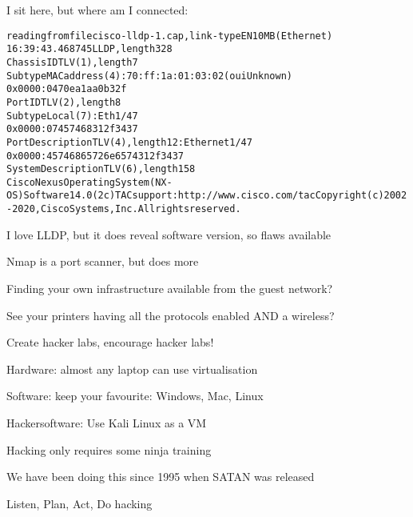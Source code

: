 \documentclass[Screen16to9,17pt,footrule]{foils}
\begin{document}
I sit here, but where am I connected:
\begin{alltt}\footnotesize
reading from file cisco-lldp-1.cap, link-type EN10MB (Ethernet)
16:39:43.468745 LLDP, length 328
	Chassis ID TLV (1), length 7
	  Subtype MAC address (4): 70:ff:1a:01:03:02 (oui Unknown)
	  0x0000:  0470 ea1a a0b3 2f
	Port ID TLV (2), length 8
	  Subtype Local (7): Eth1/47
	  0x0000:  0745 7468 312f 3437
	Port Description TLV (4), length 12: Ethernet1/47
	  0x0000:  4574 6865 726e 6574 312f 3437
	System Description TLV (6), length 158
	  Cisco Nexus Operating System (NX-OS) Software 14.0(2c) TAC support: http://www.cisco.com/tac Copyright (c) 2002-2020, Cisco Systems, Inc. All rights reserved.
\end{alltt}

\vskip 5mm
\centerline{I love LLDP, but it does reveal software version, so flaws available}





\begin{list2}
\item Nmap is a port scanner, but does more
\item Finding your own infrastructure available from the guest network?
\item See your printers having all the protocols enabled AND a wireless?
\end{list2}



\begin{list2}
\item Create hacker labs, encourage hacker labs!
\item Hardware: almost any laptop can use virtualisation
\item Software: keep your favourite: Windows, Mac, Linux
\item Hackersoftware: Use Kali Linux as a VM 
\end{list2}



\begin{list2}
\item Hacking only requires some ninja training
\item We have been doing this since 1995 when SATAN was released
\item Listen, Plan, Act, Do hacking
\end{list2}


\myquestionspage
\end{document}
